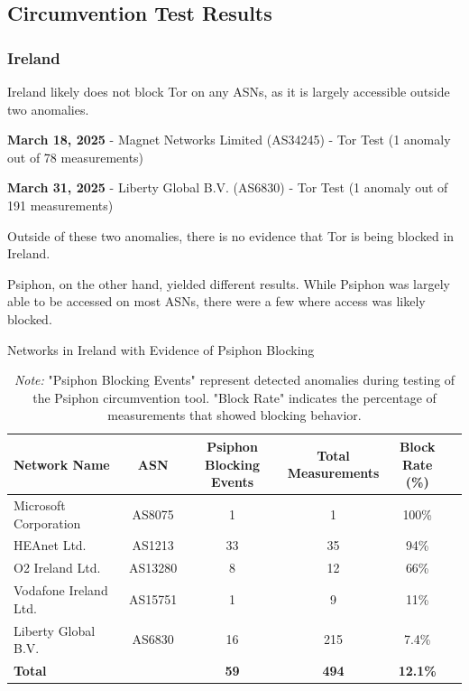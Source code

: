\subsection{Circumvention Test Results}

\subsubsection{Ireland}

Ireland likely does not block Tor on any ASNs, as it is largely accessible outside two anomalies.

\textbf{March 18, 2025} - Magnet Networks Limited (AS34245) - Tor Test (1 anomaly out of 78 measurements)

\textbf{March 31, 2025} - Liberty Global B.V. (AS6830) - Tor Test (1 anomaly out of 191 measurements)

Outside of these two anomalies, there is no evidence that Tor is being blocked in Ireland.

Psiphon, on the other hand, yielded different results. While Psiphon was largely able to be accessed on most ASNs, there were a few where access was likely blocked. 

\vspace{2em}

\begin{table}[H]
\centering
\caption{Networks in Ireland with Evidence of Psiphon Blocking}
\begin{tabular}{lccccc}
\toprule
\textbf{Network Name} & \textbf{ASN} & \shortstack{\textbf{Psiphon} \\ \textbf{Blocking Events}} & \shortstack{\textbf{Total} \\ \textbf{Measurements}} & \shortstack{\textbf{Block} \\ \textbf{Rate (\%)}} \\
\midrule
Microsoft Corporation           & AS8075  & 1  & 1   & 100\%  \\
HEAnet Ltd.                     & AS1213  & 33 & 35  & 94\%   \\
O2 Ireland Ltd.                 & AS13280 & 8  & 12  & 66\%   \\
Vodafone Ireland Ltd.           & AS15751 & 1  & 9   & 11\%   \\
Liberty Global B.V.             & AS6830  & 16 & 215 & 7.4\%  \\
\bottomrule
\textbf{Total} &  & \textbf{59} & \textbf{494} & \textbf{12.1\%} \\
\end{tabular}

\vspace{1em}

\caption*{\textit{Note:} "Psiphon Blocking Events" represent detected anomalies during testing of the Psiphon circumvention tool. "Block Rate" indicates the percentage of measurements that showed blocking behavior.}
\label{tab:psiphon_block_ireland}
\end{table}

